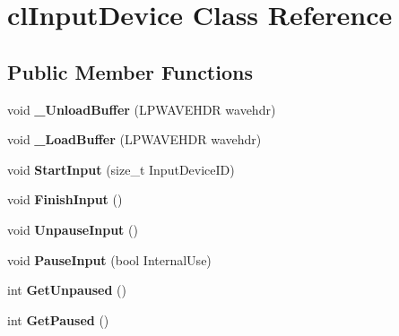 \hypertarget{classcl_input_device}{
\section{clInputDevice Class Reference}
\label{classcl_input_device}
}
\subsection*{Public Member Functions}
\begin{DoxyCompactItemize}
\item 
\hypertarget{classcl_input_device_a24e587770b2869c0873d43b64b3b40fb}{
void {\bfseries \_\-UnloadBuffer} (LPWAVEHDR wavehdr)}
\label{classcl_input_device_a24e587770b2869c0873d43b64b3b40fb}

\item 
\hypertarget{classcl_input_device_a89b69a228e31b0c849996e676a87b388}{
void {\bfseries \_\-LoadBuffer} (LPWAVEHDR wavehdr)}
\label{classcl_input_device_a89b69a228e31b0c849996e676a87b388}

\item 
\hypertarget{classcl_input_device_a5424b7cb24221473fc624a1a29e7a7ea}{
void {\bfseries StartInput} (size\_\-t InputDeviceID)}
\label{classcl_input_device_a5424b7cb24221473fc624a1a29e7a7ea}

\item 
\hypertarget{classcl_input_device_a9811518b91a7002930d9f094b7ad8f29}{
void {\bfseries FinishInput} ()}
\label{classcl_input_device_a9811518b91a7002930d9f094b7ad8f29}

\item 
\hypertarget{classcl_input_device_a457d424c3c6d37c9bd7da1faa8ab16b2}{
void {\bfseries UnpauseInput} ()}
\label{classcl_input_device_a457d424c3c6d37c9bd7da1faa8ab16b2}

\item 
\hypertarget{classcl_input_device_ad74cda56965f79e4c44ca5afd1f0023f}{
void {\bfseries PauseInput} (bool InternalUse)}
\label{classcl_input_device_ad74cda56965f79e4c44ca5afd1f0023f}

\item 
\hypertarget{classcl_input_device_a932ef66e1ce2edcc515bb739628fcb56}{
int {\bfseries GetUnpaused} ()}
\label{classcl_input_device_a932ef66e1ce2edcc515bb739628fcb56}

\item 
\hypertarget{classcl_input_device_abdfc3e8273358f5e56d5597ed1034aa6}{
int {\bfseries GetPaused} ()}
\label{classcl_input_device_abdfc3e8273358f5e56d5597ed1034aa6}


\end{DoxyCompactItemize}
